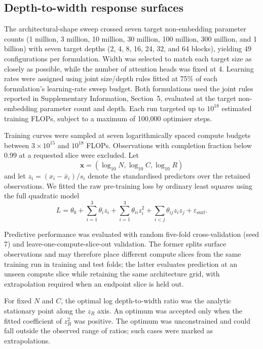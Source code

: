 \documentclass[pdflatex,sn-nature]{sn-jnl}%
\theoremstyle{thmstyleone}%
\theoremstyle{thmstyletwo}%
\theoremstyle{thmstylethree}%
\begin{document}
\subsection{Depth-to-width response surfaces}
\label{sec:quad}
The architectural-shape sweep crossed seven target non-embedding parameter counts (1 million, 3 million, 10 million, 30 million, 100 million, 300 million, and 1 billion) with seven target depths (2, 4, 8, 16, 24, 32, and 64 blocks), yielding 49 configurations per formulation.
Width was selected to match each target size as closely as possible, while the number of attention heads was fixed at 4.
Learning rates were assigned using joint size/depth rules fitted at 75\% of each formulation's learning-rate sweep budget.
Both formulations used the joint rules reported in Supplementary Information, Section~5, evaluated at the target non-embedding parameter count and depth.
Each run targeted up to \(10^{18}\) estimated training FLOPs, subject to a maximum of 100,000 optimiser steps.

Training curves were sampled at seven logarithmically spaced compute budgets between \(3\times10^{15}\) and \(10^{18}\) FLOPs.
Observations with completion fraction below 0.99 at a requested slice were excluded.
Let
\begin{equation}
    \mathbf{x}=(\log_{10}N,\log_{10}C,\log_{10}R)
\end{equation}
and let \(z_i=(x_i-\bar{x}_i)/s_i\) denote the standardised predictors over the retained observations.
We fitted the raw pre-training loss by ordinary least squares using the full quadratic model
\begin{equation}
    L = \theta_0 + \sum_{i=1}^{3}\theta_i z_i
      + \sum_{i=1}^{3}\theta_{ii}z_i^2
      + \sum_{i<j}\theta_{ij}z_i z_j + \varepsilon_{\mathrm{surf}}.
\end{equation}

Predictive performance was evaluated with random five-fold cross-validation (seed 7) and leave-one-compute-slice-out validation.
The former splits surface observations and may therefore place different compute slices from the same training run in training and test folds; the latter evaluates prediction at an unseen compute slice while retaining the same architecture grid, with extrapolation required when an endpoint slice is held out.

For fixed \(N\) and \(C\), the optimal log depth-to-width ratio was the analytic stationary point along the \(z_R\) axis.
An optimum was accepted only when the fitted coefficient of \(z_R^2\) was positive.
The optimum was unconstrained and could fall outside the observed range of ratios; such cases were marked as extrapolations.
\end{document}
